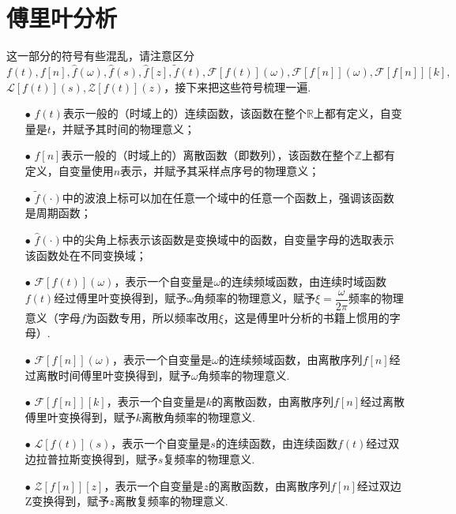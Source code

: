 \documentclass[main.tex]{subfiles}
\begin{document}
\part{傅里叶分析}
\setcounter{section}{0}

这一部分的符号有些混乱，请注意区分\(f(t), f[n], \hat{f}(\omega), \hat{f}(s), \hat{f}[z], \tilde{f}(t), \mathcal{F}[f(t)](\omega),\mathcal{F}[f[n]](\omega), \mathcal{F}[f[n]][k],\)
\newline
\( \mathcal{L}[f(t)](s), \mathcal{Z}[f(t)](z)\)，接下来把这些符号梳理一遍.
\newline
\begin{itemize}
    \item[\(\bullet\)] \(f(t)\)表示一般的（时域上的）连续函数，该函数在整个\(\mathbb{R}\)上都有定义，自变量是\(t\)，并赋予其时间的物理意义；
    \item[\(\bullet\)] \(f[n]\)表示一般的（时域上的）离散函数（即数列），该函数在整个\(\mathbb{Z}\)上都有定义，自变量使用\(n\)表示，并赋予其采样点序号的物理意义；
    \item[\(\bullet\)] \(\tilde{f}(\cdot)\)中的波浪上标可以加在任意一个域中的任意一个函数上，强调该函数是周期函数；
    \item[\(\bullet\)] \(\hat{f}(\cdot)\)中的尖角上标\(\hat{}\)表示该函数是变换域中的函数，自变量字母的选取表示该函数处在不同变换域；
    \item[\(\bullet\)] \(\mathcal{F}\left[f(t)\right](\omega)\)，表示一个自变量是\(\omega\)的连续频域函数，由连续时域函数\(f(t)\)经过傅里叶变换得到，赋予\(\omega\)角频率的物理意义，赋予\(\xi=\dfrac{\omega}{2 \pi}\)频率的物理意义（字母\(f\)为函数专用，所以频率改用\(\xi\)，这是傅里叶分析的书籍上惯用的字母）. 
    \item[\(\bullet\)] \(\mathcal{F}\left[f[n]\right](\omega)\)，表示一个自变量是\(\omega\)的连续频域函数，由离散序列\(f[n]\)经过离散时间傅里叶变换得到，赋予\(\omega\)角频率的物理意义.
    \item[\(\bullet\)] \(\mathcal{F}\left[f[n]\right][k]\)，表示一个自变量是\(k\)的离散函数，由离散序列\(f[n]\)经过离散傅里叶变换得到，赋予\(k\)离散角频率的物理意义.
    \item[\(\bullet\)] \(\mathcal{L}\left[f(t)\right](s)\)，表示一个自变量是\(s\)的连续函数，由连续函数\(f(t)\)经过双边拉普拉斯变换得到，赋予\(s\)复频率的物理意义.
    \item[\(\bullet\)] \(\mathcal{Z}\left[f[n]\right][z]\)，表示一个自变量是\(z\)的离散函数，由离散序列\(f[n]\)经过双边Z变换得到，赋予\(z\)离散复频率的物理意义. 
\end{itemize}
\end{document}
